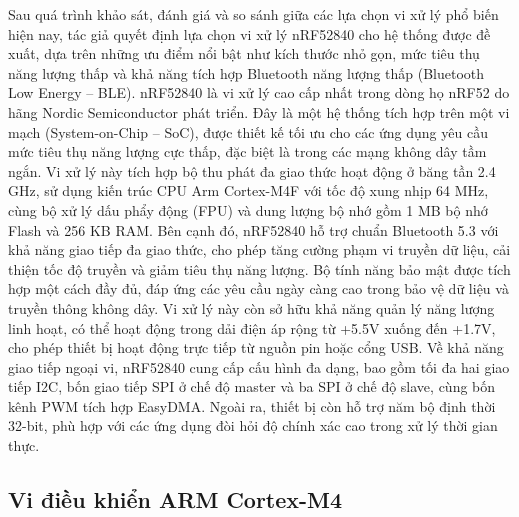 Sau quá trình khảo sát, đánh giá và so sánh giữa các lựa chọn vi xử lý phổ biến hiện nay, tác giả quyết định lựa chọn vi xử lý nRF52840 \cite{nrf} cho hệ thống được đề xuất, dựa trên những ưu điểm nổi bật như kích thước nhỏ gọn, mức tiêu thụ năng lượng thấp và khả năng tích hợp Bluetooth năng lượng thấp (Bluetooth Low Energy – BLE). nRF52840 là vi xử lý cao cấp nhất trong dòng họ nRF52 do hãng Nordic Semiconductor phát triển. Đây là một hệ thống tích hợp trên một vi mạch (System-on-Chip – SoC), được thiết kế tối ưu cho các ứng dụng yêu cầu mức tiêu thụ năng lượng cực thấp, đặc biệt là trong các mạng không dây tầm ngắn. Vi xử lý này tích hợp bộ thu phát đa giao thức hoạt động ở băng tần 2.4 GHz, sử dụng kiến trúc CPU Arm Cortex-M4F với tốc độ xung nhịp 64 MHz, cùng bộ xử lý dấu phẩy động (FPU) và dung lượng bộ nhớ gồm 1 MB bộ nhớ Flash và 256 KB RAM. Bên cạnh đó, nRF52840 hỗ trợ chuẩn Bluetooth 5.3 với khả năng giao tiếp đa giao thức, cho phép tăng cường phạm vi truyền dữ liệu, cải thiện tốc độ truyền và giảm tiêu thụ năng lượng. Bộ tính năng bảo mật được tích hợp một cách đầy đủ, đáp ứng các yêu cầu ngày càng cao trong bảo vệ dữ liệu và truyền thông không dây. Vi xử lý này còn sở hữu khả năng quản lý năng lượng linh hoạt, có thể hoạt động trong dải điện áp rộng từ +5.5V xuống đến +1.7V, cho phép thiết bị hoạt động trực tiếp từ nguồn pin hoặc cổng USB. Về khả năng giao tiếp ngoại vi, nRF52840 cung cấp cấu hình đa dạng, bao gồm tối đa hai giao tiếp I2C, bốn giao tiếp SPI ở chế độ master và ba SPI ở chế độ slave, cùng bốn kênh PWM tích hợp EasyDMA. Ngoài ra, thiết bị còn hỗ trợ năm bộ định thời 32-bit, phù hợp với các ứng dụng đòi hỏi độ chính xác cao trong xử lý thời gian thực.



\subsection{Vi điều khiển ARM Cortex-M4}

